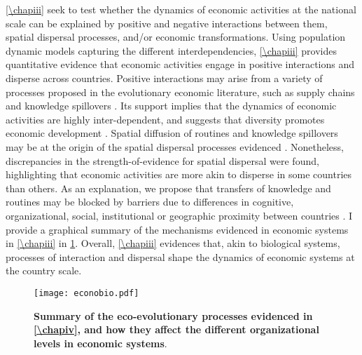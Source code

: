 \cref{\chapiii} seek to test whether the dynamics of economic activities at the national scale can be explained by positive and negative interactions between them, spatial dispersal processes, and/or economic transformations.
% 
% 
Using population dynamic models capturing the different interdependencies, \cref{\chapiii} provides quantitative evidence that economic activities engage in positive interactions and disperse across countries.
% 
Positive interactions may arise from a variety of processes proposed in the evolutionary economic literature, such as supply chains \citep{Ozman2009,Saavedra2009a} and knowledge spillovers \citep{Menon2015}. 
% 
Its support implies that the dynamics of economic activities are highly inter-dependent, and suggests that diversity promotes economic development \citep{Hidalgo2018}.
% 
Spatial diffusion of routines \cite{Hodgson2004} and knowledge spillovers \cite{Caragliu2016} may be at the origin of the spatial dispersal processes evidenced \citep{Zahra2000,RogersEverettM2003DoI,Boschma2008}. Nonetheless, discrepancies in the strength-of-evidence for spatial dispersal were found, highlighting that economic activities are more akin to disperse in some countries than others. As an explanation, we propose that transfers of knowledge and routines may be blocked by barriers due to differences in cognitive, organizational, social, institutional or geographic proximity between countries \citep{Boschma2005,Caragliu2016}.
% 
I provide a graphical summary of the mechanisms evidenced in economic systems in \cref{\chapiii} in \cref{fig:summary_econobio}. Overall, \cref{\chapiii} evidences that, akin to biological systems, processes of interaction and dispersal shape the dynamics of economic systems at the country scale.

\begin{figure}[t]
    \centering
    \texttt{[image: econobio.pdf]}
    \caption{\textbf{Summary of the eco-evolutionary processes evidenced in \cref{\chapiv}, and how they affect the different organizational levels in economic systems}.}
    \label{fig:summary_econobio}
\end{figure}

% 

